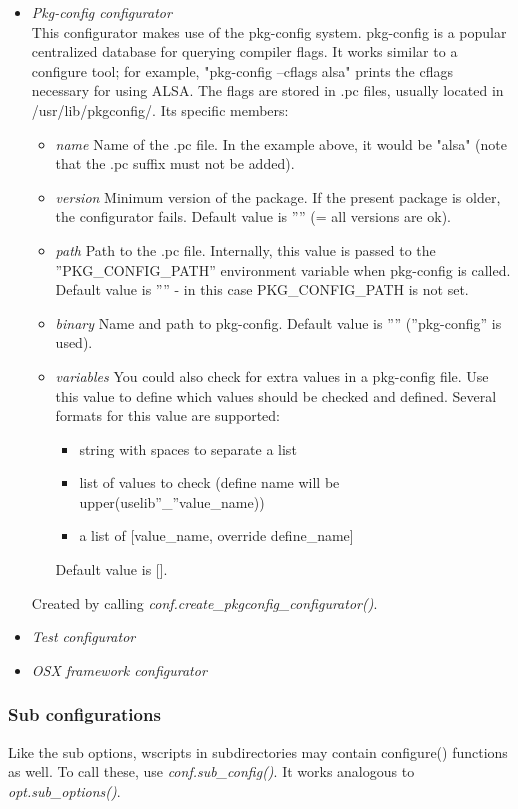 \documentclass[a4,10pt]{article}
\begin{document}
\begin{itemize}
	\item \emph{Pkg-config configurator}\\
	This configurator makes use of the pkg-config system. pkg-config is a popular centralized database for querying compiler flags. It works similar to a configure tool; for example, "pkg-config --cflags alsa" prints the cflags necessary for using ALSA. The flags are stored in .pc files, usually located in /usr/lib/pkgconfig/.
	Its specific members:
	\begin{itemize}
		\item \emph{name} Name of the .pc file. In the example above, it would be "alsa" (note that the .pc suffix must not be added).
		\item \emph{version} Minimum version of the package. If the present package is older, the configurator fails. Default value is '''' (= all versions are ok).
		\item \emph{path} Path to the .pc file. Internally, this value is passed to the ''PKG\_CONFIG\_PATH'' environment variable when pkg-config is called. Default value is '''' - in this case PKG\_CONFIG\_PATH is not set.
		\item \emph{binary} Name and path to pkg-config. Default value is '''' (''pkg-config'' is used).
		\item \emph{variables} You could also check for extra values in a pkg-config file. Use this value to define which values should be checked and defined. Several formats for this value are supported:
		\begin{itemize}
			\item{string with spaces to separate a list}
			\item{list of values to check (define name will be upper(uselib''\_''value\_name))}
			\item{a list of [value\_name, override define\_name]}
		\end{itemize}
		Default value is [].
	\end{itemize}

	Created by calling \emph{conf.create\_pkgconfig\_configurator()}.

	\item \emph{Test configurator}\\

	\item \emph{OSX framework configurator}\\
\end{itemize}

\subsubsection{Sub configurations}
Like the sub options, wscripts in subdirectories may contain configure() functions as well. To call these, use \emph{conf.sub\_config()}. It works analogous to \emph{opt.sub\_options()}.
\end{document}
